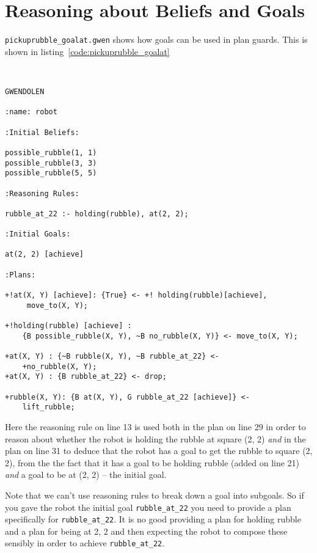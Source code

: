 \section{Reasoning about Beliefs and Goals}
\texttt{pickuprubble\_goalat.gwen} shows how goals can be used in plan guards.  This is shown in listing~\ref{code:pickuprubble_goalat}
\begin{ourexample}
\label{code:pickuprubble_goalat} \quad \\
\begin{lstlisting}[basicstyle=\sffamily,style=easslisting,language=Gwendolen]
GWENDOLEN

:name: robot

:Initial Beliefs:

possible_rubble(1, 1)
possible_rubble(3, 3)
possible_rubble(5, 5)

:Reasoning Rules:

rubble_at_22 :- holding(rubble), at(2, 2);

:Initial Goals:

at(2, 2) [achieve]

:Plans:

+!at(X, Y) [achieve]: {True} <- +! holding(rubble)[achieve],
     move_to(X, Y);

+!holding(rubble) [achieve] : 
    {B possible_rubble(X, Y), ~B no_rubble(X, Y)} <- move_to(X, Y);

+at(X, Y) : {~B rubble(X, Y), ~B rubble_at_22} <- 
    +no_rubble(X, Y);
+at(X, Y) : {B rubble_at_22} <- drop;

+rubble(X, Y): {B at(X, Y), G rubble_at_22 [achieve]} <- 
    lift_rubble;
\end{lstlisting}
\end{ourexample}
Here the reasoning rule on line 13 is used both in the plan on line 29 in order to reason about whether the robot is holding the rubble at square (2, 2) \emph{and} in the plan on line 31 to deduce that the robot has a goal to get the rubble to square (2, 2), from the the fact that it has a goal to be holding rubble (added on line 21) \emph{and} a goal to be at (2, 2) -- the initial goal.

Note that we can't use reasoning rules to break down a goal into subgoals.  So if you gave the robot the initial goal \lstinline{rubble_at_22} you need to provide a plan specifically for \lstinline{rubble_at_22}.  It is no good providing a plan for holding rubble and a plan for being at 2, 2 and then expecting the robot to compose these sensibly in order to achieve \lstinline{rubble_at_22}.

